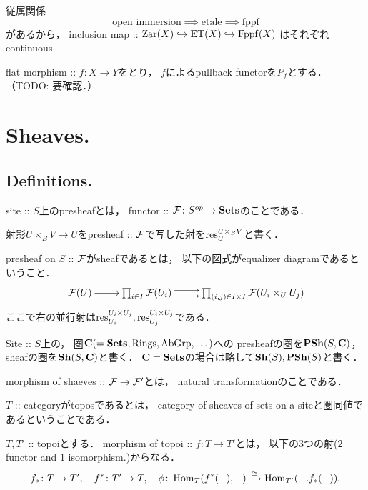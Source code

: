 \documentclass[a4paper, dvipdfmx]{jsarticle}
\begin{document}
\begin{Example}
    従属関係
    \[ \text{open immersion} \implies \text{etale} \implies \text{fppf} \]
    があるから，
    inclusion map :: $\mathrm{Zar}(X) \hookrightarrow \mathrm{ET}(X) \hookrightarrow \mathrm{Fppf}(X)$
    はそれぞれcontinuous.
\end{Example}

\begin{Example}
    flat morphism :: $f \colon X \to Y$をとり，
    $f$によるpullback functorを$P_{f}$とする．
    （TODO: 要確認．）
\end{Example}

\section{Sheaves.}
\subsection{Definitions.}
\begin{Def}
    \begin{myenum}
    \item
    site :: $S$上のpresheafとは，
    functor :: $\mathcal{F} \colon S^{op} \to \mathbf{Sets}$のことである．

    \item
    射影$U \times_B V \to U$をpresheaf :: $\mathcal{F}$で写した射を$\operatorname{res}_{U}^{U \times_B V}$と書く．

    \item
    presheaf on $S$ :: $\mathcal{F}$がsheafであるとは，
    以下の図式がequalizer diagramであるということ．
    \[\xymatrix{
        \shF(U) \ar[r]& \prod_{i \in I} \shF(U_i)
            \ar@<1mm>[r]\ar@<-1mm>[r]& \prod_{(i,j) \in I \times I} \shF(U_i \times_U U_j)
    }\]
    ここで右の並行射は$\operatorname{res}_{U_i}^{U_i \times U_j}, \operatorname{res}_{U_j}^{U_i \times U_j}$である．

    \item
    Site :: $S$上の，
    圏$\mathbf{C}(=\mathbf{Sets}, \mathrm{Rings}, \mathrm{AbGrp}, \dots)$への
    presheafの圏を$\mathbf{PSh}(S, \mathbf{C})$，sheafの圏を$\mathbf{Sh}(S, \mathbf{C})$と書く．
    $\mathbf{C}=\mathbf{Sets}$の場合は略して$\mathbf{Sh}(S), \mathbf{PSh}(S)$と書く．

    \item
    morphism of shaeves :: $\mathcal{F} \to \mathcal{F}'$とは，
    natural transformationのことである．

    \item
    $T$ :: categoryがtoposであるとは，
    category of sheaves of sets on a siteと圏同値であるということである．

    \item
    $T, T'$ :: topoiとする．
    morphism of topoi :: $f \colon T \to T'$とは，
    以下の$3$つの射($2$ functor and $1$ isomorphism.)からなる．
    \[
        f_* \colon T \to T', \quad f^* \colon T' \to T,
        \quad \phi \colon \operatorname{Hom}_{T}(f^*(-), -) \xrightarrow{\cong} \operatorname{Hom}_{T'}(-. f_*(-)).
    \]
    \end{myenum}
\end{Def}
\end{document}
